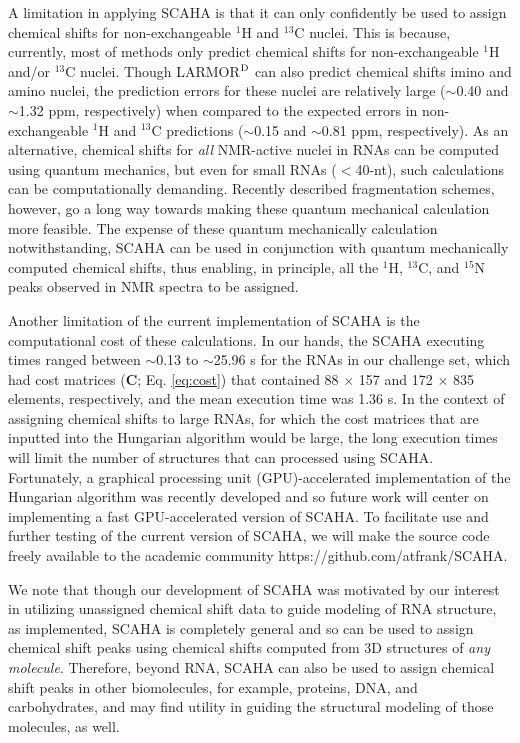\documentclass[journal=jcisd8,manuscript=article,layout=onecolumn]{achemso}
\begin{document}
{A limitation in applying SCAHA is that it can only confidently be used to assign chemical shifts for non-exchangeable $^{1}$H and $^{13}$C nuclei. This is because, currently, most of methods only predict chemical shifts for non-exchangeable $^{1}$H and/or $^{13}$C nuclei\cite{dejaegere1999an, cromsigt2001prediction, frank2013prediction, frank2014simple}. Though LARMOR$^{\rm D}$ can also predict chemical shifts imino and amino nuclei, the prediction errors for these nuclei are relatively large ($\sim$0.40 and $\sim$1.32 ppm, respectively)\cite{frank2014simple} when compared to the expected errors in non-exchangeable $^{1}$H and $^{13}$C predictions ($\sim$0.15 and $\sim$0.81 ppm, respectively)\cite{frank2014simple}. As an alternative, chemical shifts for \textit{all} NMR-active nuclei in RNAs can be computed using quantum mechanics, but even for small RNAs ($<$40-nt), such calculations can be computationally demanding.  Recently described fragmentation schemes, however, go a long way towards making these quantum mechanical calculation more feasible\cite{swails2015afnmr}. The expense of these quantum mechanically calculation notwithstanding, SCAHA can be used in conjunction with quantum mechanically computed chemical shifts, thus enabling, in principle, all the $^{1}$H, $^{13}$C,  and $^{15}$N peaks observed in NMR spectra to be assigned.
	
Another limitation of the current implementation of SCAHA is the computational cost of these calculations. In our hands, the SCAHA executing times ranged between $\sim$0.13 to $\sim$25.96 s for the RNAs in our challenge set, which had cost matrices ($\mathbf{C}$; Eq. \ref{eq:cost}) that contained 88 $\times$ 157  and 172 $\times$ 835 elements, respectively, and the mean execution time was 1.36 s. In the context of assigning chemical shifts to large RNAs, for which the cost matrices that are inputted into the Hungarian algorithm would be large, the long execution times will limit the number of structures that can processed using SCAHA. Fortunately, a graphical processing unit (GPU)-accelerated implementation of the Hungarian algorithm was recently developed\cite{date2016gpu} and so future work will center on implementing a fast GPU-accelerated version of SCAHA. To facilitate use and further testing of the current version of SCAHA, we will make  the source code freely available to the academic community https://github.com/atfrank/SCAHA. 

We note that though our development of SCAHA was motivated by our interest in utilizing unassigned chemical shift data to guide modeling of RNA structure, as implemented, SCAHA is completely general and so can be used to assign chemical shift peaks using chemical shifts computed from 3D structures of \textit{any molecule}. Therefore, beyond RNA, SCAHA can  also be used to assign chemical shift peaks in other biomolecules, for example, proteins, DNA, and carbohydrates, and may find utility in guiding the structural modeling of those molecules, as well.

}
\end{document}
